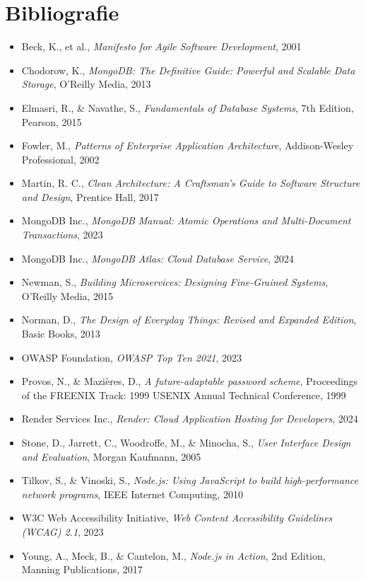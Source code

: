 \documentclass[12pt,a4paper]{report}
\begin{document}
\chapter{Bibliografie}
\begin{itemize}
    \item Beck, K., et al., \textit{Manifesto for Agile Software Development}, 2001
    \item Chodorow, K., \textit{MongoDB: The Definitive Guide: Powerful and Scalable Data Storage}, O'Reilly Media, 2013
    \item Elmasri, R., \& Navathe, S., \textit{Fundamentals of Database Systems}, 7th Edition, Pearson, 2015
    \item Fowler, M., \textit{Patterns of Enterprise Application Architecture}, Addison-Wesley Professional, 2002
    \item Martin, R. C., \textit{Clean Architecture: A Craftsman's Guide to Software Structure and Design}, Prentice Hall, 2017
    \item MongoDB Inc., \textit{MongoDB Manual: Atomic Operations and Multi-Document Transactions}, 2023
    \item MongoDB Inc., \textit{MongoDB Atlas: Cloud Database Service}, 2024
    \item Newman, S., \textit{Building Microservices: Designing Fine-Grained Systems}, O'Reilly Media, 2015
    \item Norman, D., \textit{The Design of Everyday Things: Revised and Expanded Edition}, Basic Books, 2013
    \item OWASP Foundation, \textit{OWASP Top Ten 2021}, 2023
    \item Provos, N., \& Mazières, D., \textit{A future-adaptable password scheme}, Proceedings of the FREENIX Track: 1999 USENIX Annual Technical Conference, 1999
    \item Render Services Inc., \textit{Render: Cloud Application Hosting for Developers}, 2024
    \item Stone, D., Jarrett, C., Woodroffe, M., \& Minocha, S., \textit{User Interface Design and Evaluation}, Morgan Kaufmann, 2005
    \item Tilkov, S., \& Vinoski, S., \textit{Node.js: Using JavaScript to build high-performance network programs}, IEEE Internet Computing, 2010
    \item W3C Web Accessibility Initiative, \textit{Web Content Accessibility Guidelines (WCAG) 2.1}, 2023
    \item Young, A., Meck, B., \& Cantelon, M., \textit{Node.js in Action}, 2nd Edition, Manning Publications, 2017

\end{itemize}
\end{document}
